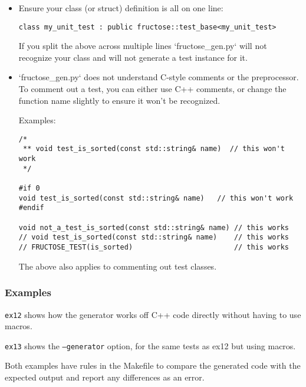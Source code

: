 \documentclass{book}
\begin{document}
\begin{itemize}
\item Ensure your class (or struct) definition is all on one line:
\begin{verbatim}
class my_unit_test : public fructose::test_base<my_unit_test>
\end{verbatim}

If you split the above across multiple lines `fructose\_gen.py` will not
recognize your class and will not generate a test instance for it.

\item  `fructose\_gen.py` does not understand C-style comments or 
the preprocessor. To comment out a test, you can either use C++ comments, 
or change the function name slightly to ensure it won't be recognized. 

Examples:
\begin{verbatim}
/*
 ** void test_is_sorted(const std::string& name)  // this won't work
 */

#if 0
void test_is_sorted(const std::string& name)   // this won't work
#endif

void not_a_test_is_sorted(const std::string& name) // this works
// void test_is_sorted(const std::string& name)    // this works
// FRUCTOSE_TEST(is_sorted)                        // this works
\end{verbatim}
The above also applies to commenting out test classes.
\end{itemize}

\subsubsection{Examples}

{\tt ex12} shows how the generator works off C++ code directly without having
to use macros.

{\tt ex13} shows the {\tt --generator} option, for the same tests as
ex12 but using macros.

Both examples have rules in the Makefile to compare the generated 
code with the expected output
and report any differences as an error.

\end{document}
